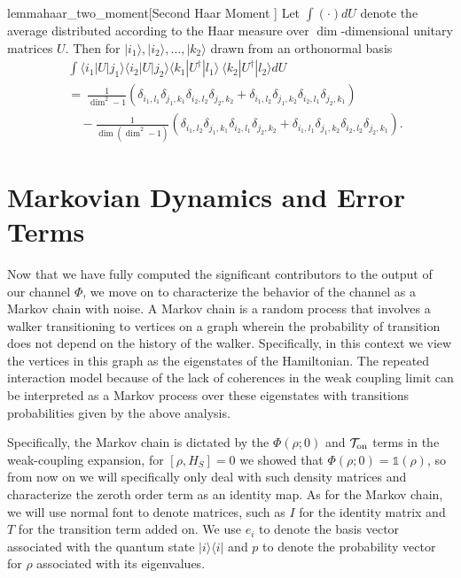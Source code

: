 \documentclass[
 amsmath,amssymb,
 aps,
onecolumn, 
nofootinbib]{revtex4-2}
\newcommand{\on}{\rm on}
\newcommand{\ket}[1]{|#1\rangle}
\newcommand{\bra}[1]{\langle #1|}
\newcommand{\ketbra}[2]{| #1\rangle\! \langle #2|}
\newcommand{\parens}[1]{\left( #1 \right)}
\newcommand{\identity}{\mathds{1}}
\begin{document}
\begin{restatable}{lemma}{haar_two_moment}[Second Haar Moment \cite{brandao2021complexity}] \label{lem:haar_two_moment}
    Let $\int (\cdot) dU$ denote the average distributed according to the Haar measure over $\dim$-dimensional unitary matrices $U$. Then for $\ket{i_1},\ket{i_2},\ldots,\ket{k_2}$ drawn from an orthonormal basis
    \begin{align}
        &\int \bra{i_1} U \ket{j_1} \bra{i_2} U \ket{j_2} \bra{k_1} U^\dagger \ket{l_1} ~ \bra{k_2} U^\dagger \ket{l_2} dU \nonumber \\
        &= ~\frac{1}{\dim^2 - 1} \parens{\delta_{i_1, l_1} \delta_{j_1, k_1} \delta_{i_2, l_2} \delta_{j_2, k_2} + \delta_{i_1, l_2} \delta_{j_1, k_2} \delta_{i_2, l_1} \delta_{j_2, k_1}} \nonumber \\
        &\quad - \frac{1}{\dim(\dim^2 - 1)} \parens{\delta_{i_1, l_2} \delta_{j_1, k_1} \delta_{i_2, l_1} \delta_{j_2, k_2} + \delta_{i_1, l_1} \delta_{j_1, k_2} \delta_{i_2, l_2} \delta_{j_2, k_1}}. \label{eq:haar_two_moment_integral}
    \end{align}
\end{restatable}



\section{Markovian Dynamics and Error Terms} \label{sec:markov}

Now that we have fully computed the significant contributors to the output of our channel $\Phi$, we move on to characterize the behavior of the channel as a Markov chain with noise. 
A Markov chain is a random process that involves a walker transitioning to vertices on a graph wherein the probability of transition does not depend on the history of the walker.  Specifically, in this context we view the vertices in this graph as the eigenstates of the Hamiltonian.  The repeated interaction model because of the lack of coherences in the weak coupling limit can be interpreted as a Markov process over these eigenstates with transitions probabilities given by the above analysis. 

Specifically, the Markov chain is dictated by the $\Phi(\rho; 0)$ and $\mathcal{T}_{\on}$ terms in the weak-coupling expansion, for $[\rho, H_S] = 0$ we showed that $\Phi(\rho; 0) = \identity(\rho)$, so from now on we will specifically only deal with such density matrices and characterize the zeroth order term as an identity map. As for the Markov chain, we will use normal font to denote matrices, such as $I$ for the identity matrix and $T$ for the transition term added on. We use $e_i$ to denote the basis vector associated with the quantum state $\ketbra{i}{i}$ and $p$ to denote the probability vector for $\rho$ associated with its eigenvalues.
\end{document}

